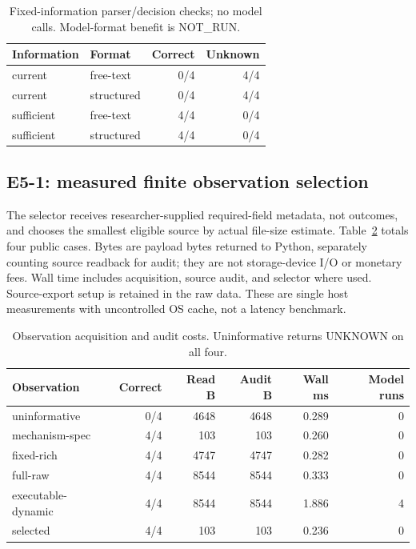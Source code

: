 \documentclass[10pt]{article}
\begin{document}
\begin{table}[ht]
\centering
\begin{tabular}{llrr}
\toprule
Information & Format & Correct & Unknown \\
\midrule
current & free-text & 0/4 & 4/4 \\
current & structured & 0/4 & 4/4 \\
sufficient & free-text & 4/4 & 0/4 \\
sufficient & structured & 4/4 & 0/4 \\
\bottomrule
\end{tabular}
\caption{Fixed-information parser/decision checks; no model calls. Model-format benefit is NOT\_RUN.}
\label{tab:packets}
\end{table}

\subsection{E5-1: measured finite observation selection}
The selector receives researcher-supplied required-field metadata, not outcomes, and chooses the smallest eligible source by actual file-size estimate. Table~\ref{tab:costs} totals four public cases. Bytes are payload bytes returned to Python, separately counting source readback for audit; they are not storage-device I/O or monetary fees. Wall time includes acquisition, source audit, and selector where used. Source-export setup is retained in the raw data. These are single host measurements with uncontrolled OS cache, not a latency benchmark.

\begin{table}[ht]
\centering\small
\begin{tabular}{lrrrrr}
\toprule
Observation & Correct & Read B & Audit B & Wall ms & Model runs \\
\midrule
uninformative & 0/4 & 4648 & 4648 & 0.289 & 0 \\
mechanism-spec & 4/4 & 103 & 103 & 0.260 & 0 \\
fixed-rich & 4/4 & 4747 & 4747 & 0.282 & 0 \\
full-raw & 4/4 & 8544 & 8544 & 0.333 & 0 \\
executable-dynamic & 4/4 & 8544 & 8544 & 1.886 & 4 \\
selected & 4/4 & 103 & 103 & 0.236 & 0 \\
\bottomrule
\end{tabular}
\caption{Observation acquisition and audit costs. Uninformative returns UNKNOWN on all four.}
\label{tab:costs}
\end{table}
\end{document}
